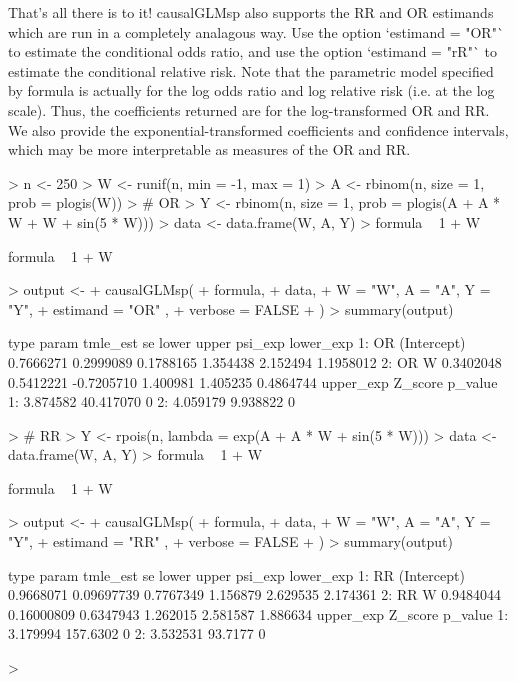 \documentclass{article}
\begin{document}
 
 
That's all there is to it! causalGLMsp also supports the RR and OR estimands which are run in a completely analagous way. Use the option `estimand = "OR"` to estimate the conditional odds ratio, and use the option `estimand = "rR"` to estimate the conditional relative risk. Note that the parametric model specified by formula is actually for the log odds ratio and log relative risk (i.e. at the log scale). Thus, the coefficients returned are for the log-transformed OR and RR. We also provide the exponential-transformed coefficients and confidence intervals, which may be more interpretable as measures of the OR and RR.

\begin{Schunk}
\begin{Sinput}
> n <- 250
> W <- runif(n, min = -1,  max = 1)
> A <- rbinom(n, size = 1, prob = plogis(W))
> # OR
> Y <- rbinom(n, size =  1, prob = plogis(A + A * W + W + sin(5 * W)))
> data <- data.frame(W, A, Y)
> formula ~ 1 + W
\end{Sinput}
\begin{Soutput}
formula ~ 1 + W
\end{Soutput}
\begin{Sinput}
> output <-
+   causalGLMsp(
+     formula,
+     data,
+     W = "W", A = "A", Y = "Y",
+     estimand = "OR" ,
+     verbose = FALSE
+   )
> summary(output)
\end{Sinput}
\begin{Soutput}
   type       param  tmle_est        se      lower    upper  psi_exp lower_exp
1:   OR (Intercept) 0.7666271 0.2999089  0.1788165 1.354438 2.152494 1.1958012
2:   OR           W 0.3402048 0.5412221 -0.7205710 1.400981 1.405235 0.4864744
   upper_exp   Z_score p_value
1:  3.874582 40.417070       0
2:  4.059179  9.938822       0
\end{Soutput}
\begin{Sinput}
> # RR
> Y <- rpois(n, lambda = exp(A + A * W + sin(5 * W)))
> data <- data.frame(W, A, Y)
> formula ~ 1 + W
\end{Sinput}
\begin{Soutput}
formula ~ 1 + W
\end{Soutput}
\begin{Sinput}
> output <-
+   causalGLMsp(
+     formula,
+     data,
+     W = "W", A = "A", Y = "Y",
+     estimand = "RR" ,
+     verbose = FALSE
+   )
> summary(output)
\end{Sinput}
\begin{Soutput}
   type       param  tmle_est         se     lower    upper  psi_exp lower_exp
1:   RR (Intercept) 0.9668071 0.09697739 0.7767349 1.156879 2.629535  2.174361
2:   RR           W 0.9484044 0.16000809 0.6347943 1.262015 2.581587  1.886634
   upper_exp  Z_score p_value
1:  3.179994 157.6302       0
2:  3.532531  93.7177       0
\end{Soutput}
\begin{Sinput}
> 
\end{Sinput}
\end{Schunk}
\end{document}

